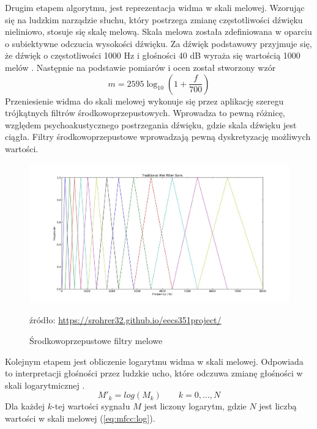 \documentclass[a4paper,12pt,twoside,openany]{report}
\newcommand{\Eq}[1]{(\ref{#1})}
\newcommand{\zrodlo}[1]{\caption*{źródło: \url{#1}}}
\begin{document}
Drugim etapem algorytmu, jest reprezentacja widma w skali melowej. 
Wzorując się na ludzkim narządzie słuchu, 
który postrzega zmianę częstotliwości dźwięku nieliniowo, stosuje się skalę melową.
Skala melowa została zdefiniowana w oparciu o subiektywne odczucia wysokości dźwięku.
Za dźwięk podstawowy przyjmuje się, że dźwięk o częstotliwości 1000 Hz i głośności 40 dB wyraża się wartością 1000 melów \cite{KrishnaKishore2013}.
Następnie na podstawie pomiarów i ocen został stworzony wzór
\begin{equation}
	m=2595\log _{10}\left(1+{\frac {f}{700}}\right)
\end{equation}
Przeniesienie widma do skali melowej wykonuje się przez aplikację szeregu trójkątnych filtrów środkowoprzepustowych. 
Wprowadza to pewną różnicę, względem psychoakustycznego postrzegania dźwięku, gdzie skala dźwięku jest ciągła.
Filtry środkowoprzepustowe wprowadzają pewną dyskretyzację możliwych wartości.
\begin{figure}[h]
	\centering
	\includegraphics[width=\textwidth]{melfilterbank}
	\caption{Środkowoprzepustowe filtry melowe}
	\zrodlo{https://srohrer32.github.io/eecs351project/}
	\label{rys:mfcc:melfilterbank}
\end{figure}

Kolejnym etapem jest obliczenie logarytmu widma w skali melowej.
Odpowiada to interpretacji głośności przez ludzkie ucho,
które odczuwa zmianę głośności w skali logarytmicznej \cite{Hossan2013}.
\begin{equation}
	M'_k=log(M_k)\qquad k=0, \dots, N
	\label{eq:mfcc:log}
\end{equation}
Dla każdej $k$-tej wartości sygnału $M$ jest liczony logarytm, gdzie $N$ jest liczbą wartości w skali melowej \Eq{eq:mfcc:log}.
\end{document}
